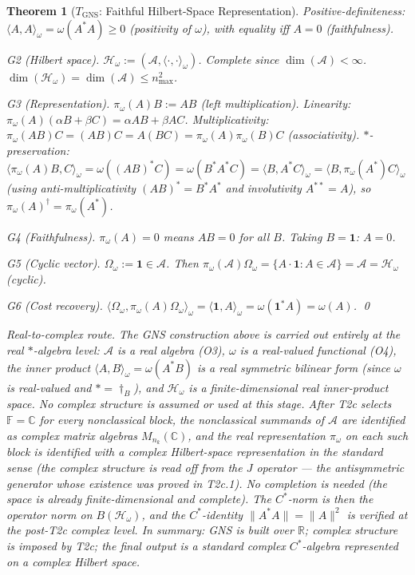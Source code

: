 \documentclass[11pt,a4paper]{article}
\newtheorem{theorem}{Theorem}[section]
\theoremstyle{definition}
\begin{document}
\begin{theorem}[$T_{\mathrm{GNS}}$: Faithful Hilbert-Space Representation]
\textit{Positive-definiteness:} $\langle A,A\rangle_\omega = \omega(A^*A) \ge 0$ (positivity of $\omega$), with equality iff $A = 0$ (faithfulness).

\textit{G2 (Hilbert space).}  $\mathcal{H}_\omega := (\mathcal{A}, \langle\cdot,\cdot\rangle_\omega)$.  Complete since $\dim(\mathcal{A}) < \infty$.  $\dim(\mathcal{H}_\omega) = \dim(\mathcal{A}) \le n_{\max}^2$.

\textit{G3 (Representation).}  $\pi_\omega(A)B := AB$ (left multiplication).  Linearity: $\pi_\omega(A)(\alpha B + \beta C) = \alpha AB + \beta AC$.  Multiplicativity: $\pi_\omega(AB)C = (AB)C = A(BC) = \pi_\omega(A)\pi_\omega(B)C$ (associativity).  $*$-preservation: $\langle \pi_\omega(A)B, C\rangle_\omega = \omega((AB)^*C) = \omega(B^*A^*C) = \langle B, A^*C\rangle_\omega = \langle B, \pi_\omega(A^*)C\rangle_\omega$ (using anti-multiplicativity $(AB)^* = B^*A^*$ and involutivity $A^{**} = A$), so $\pi_\omega(A)^\dagger = \pi_\omega(A^*)$.

\textit{G4 (Faithfulness).}  $\pi_\omega(A) = 0$ means $AB = 0$ for all $B$.  Taking $B = \mathbf{1}$: $A = 0$.

\textit{G5 (Cyclic vector).}  $\Omega_\omega := \mathbf{1} \in \mathcal{A}$.  Then $\pi_\omega(\mathcal{A})\Omega_\omega = \{A \cdot \mathbf{1} : A \in \mathcal{A}\} = \mathcal{A} = \mathcal{H}_\omega$ (cyclic).

\textit{G6 (Cost recovery).}  $\langle \Omega_\omega, \pi_\omega(A)\Omega_\omega\rangle_\omega = \langle \mathbf{1}, A\rangle_\omega = \omega(\mathbf{1}^*A) = \omega(A)$.  \qed

\smallskip\noindent\textit{Real-to-complex route.}  The GNS construction above is carried out entirely at the \emph{real} $*$-algebra level: $\mathcal{A}$ is a real algebra (O3), $\omega$ is a real-valued functional (O4), the inner product $\langle A,B\rangle_\omega = \omega(A^*B)$ is a real symmetric bilinear form (since $\omega$ is real-valued and $* = \dagger_B$), and $\mathcal{H}_\omega$ is a finite-dimensional real inner-product space.  No complex structure is assumed or used at this stage.  After T2c selects $\mathbb{F} = \mathbb{C}$ for every nonclassical block, the nonclassical summands of $\mathcal{A}$ are identified as complex matrix algebras $M_{n_k}(\mathbb{C})$, and the real representation $\pi_\omega$ on each such block is identified with a complex Hilbert-space representation in the standard sense (the complex structure is read off from the $J$ operator --- the antisymmetric generator whose existence was proved in T2c.1).  No completion is needed (the space is already finite-dimensional and complete).  The $C^*$-norm is then the operator norm on $B(\mathcal{H}_\omega)$, and the $C^*$-identity $\|A^*A\| = \|A\|^2$ is verified at the post-T2c complex level.  In summary: GNS is built over $\mathbb{R}$; complex structure is imposed by T2c; the final output is a standard complex $C^*$-algebra represented on a complex Hilbert space.


\end{theorem}
\end{document}
